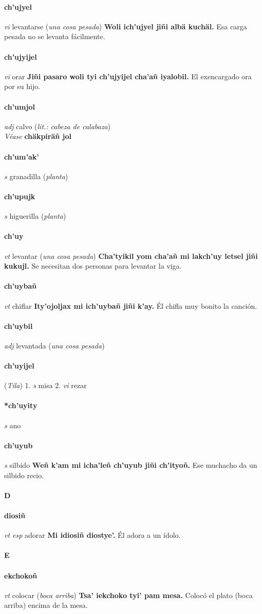 \documentclass{scrbook}
\newcommand{\entry}[1]{\paragraph{#1}}
\newcommand{\alphaletter}[1]{\addsec{#1}}
\newcommand{\onedefinition}[1]{#1.}
\newcommand{\partofspeech}[1]{\textit{#1}}
\newcommand{\spanishtranslation}[1]{#1}
\newcommand{\clarification}[1]{(\textit{#1})}
\newcommand{\cholexample}[1]{\textbf{#1}}
\newcommand{\exampletranslation}[1]{#1}
\newcommand{\alsosee}[1]{\\\textit{Véase} \textbf{#1}}
\newcommand{\relevantdialect}[1]{(\textit{#1})}
\begin{document}
\begin{multicols}{2}
\entry{ch'ujyel}
\partofspeech{vi}
\spanishtranslation{levantarse}
\clarification{una cosa pesada}
\cholexample{Woli ich'ujyel jiñi albä kuchäl.}
\exampletranslation{Esa carga pesada no se levanta fácilmente.}

\entry{ch'ujyijel}
\partofspeech{vi}
\spanishtranslation{orar}
\cholexample{Jiñi pasaro woli tyi ch'ujyijel cha'añ iyalobil.}
\exampletranslation{El exencargado ora por su hijo.}

\entry{ch'umjol}
\partofspeech{adj}
\spanishtranslation{calvo}
\clarification{lit.: cabeza de calabaza}
\alsosee{chäkpiräñ jol}

\entry{ch'um'ak'}
\partofspeech{s}
\spanishtranslation{granadilla}
\clarification{planta}

\entry{ch'upujk}
\partofspeech{s}
\spanishtranslation{higuerilla}
\clarification{planta}

\entry{ch'uy}
\partofspeech{vt}
\spanishtranslation{levantar}
\clarification{una cosa pesada}
\cholexample{Cha'tyikil yom cha'añ mi lakch'uy letsel jiñi kukujl.}
\exampletranslation{Se necesitan dos personas para levantar la viga.}

\entry{ch'uybañ}
\partofspeech{vt}
\spanishtranslation{chiflar}
\cholexample{Ity'ojoljax mi ich'uybañ jiñi k'ay.}
\exampletranslation{Él chifla muy bonito la canción.}

\entry{ch'uybil}
\partofspeech{adj}
\spanishtranslation{levantada}
\clarification{una cosa pesada}

\entry{ch'uyijel}
\relevantdialect{Tila}
\onedefinition{1}
\partofspeech{s}
\spanishtranslation{misa}
\onedefinition{2}
\partofspeech{vi}
\spanishtranslation{rezar}

\entry{*ch'uyity}
\partofspeech{s}
\spanishtranslation{ano}

\entry{ch'uyub}
\partofspeech{s}
\spanishtranslation{silbido}
\cholexample{Weñ k'am mi icha'leñ ch'uyub jiñi ch'ityoñ.}
\exampletranslation{Ese muchacho da un silbido recio.}

\entry{D}
\alphaletter{D}

\entry{diosiñ}
\partofspeech{vt esp}
\spanishtranslation{adorar}
\cholexample{Mi idiosiñ diostye'.}
\exampletranslation{Él adora a un ídolo.}

\entry{E}
\alphaletter{E}

\entry{ekchokoñ}
\partofspeech{vt}
\spanishtranslation{colocar}
\clarification{boca arriba}
\cholexample{Tsa' iekchoko tyi' pam mesa.}
\exampletranslation{Colocó el plato (boca arriba) encima de la mesa.}


\end{multicols}
\end{document}

